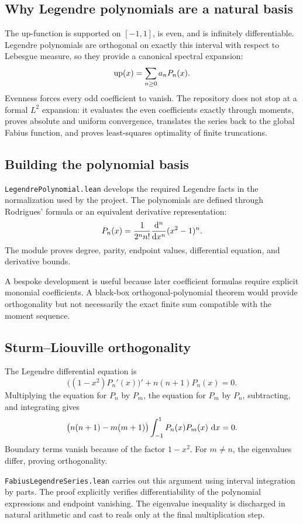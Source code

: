 \documentclass[11pt,oneside]{article}
\theoremstyle{definition}
\theoremstyle{remark}
\begin{document}
\subsection{Why Legendre polynomials are a natural basis}
The up-function is supported on \([-1,1]\), is even, and is infinitely differentiable.  Legendre polynomials are orthogonal on exactly this interval with respect to Lebesgue measure, so they provide a canonical spectral expansion:
\[
  \operatorname{up}(x)=\sum_{n\geq0}a_nP_n(x).
\]
Evenness forces every odd coefficient to vanish.  The repository does not stop at a formal \(L^2\) expansion: it evaluates the even coefficients exactly through moments, proves absolute and uniform convergence, translates the series back to the global Fabius function, and proves least-squares optimality of finite truncations.

\subsection{Building the polynomial basis}
\nolinkurl{LegendrePolynomial.lean} develops the required Legendre facts in the normalization used by the project.  The polynomials are defined through Rodrigues' formula or an equivalent derivative representation:
\[
  P_n(x)=\frac{1}{2^n n!}
          \frac{\mathop{}\!\mathrm{d}^n}{\mathop{}\!\mathrm{d} x^n}(x^2-1)^n.
\]
The module proves degree, parity, endpoint values, differential equation, and derivative bounds.

A bespoke development is useful because later coefficient formulas require explicit monomial coefficients.  A black-box orthogonal-polynomial theorem would provide orthogonality but not necessarily the exact finite sum compatible with the moment sequence.

\subsection{Sturm--Liouville orthogonality}
The Legendre differential equation is
\[
  \bigl((1-x^2)P_n'(x)\bigr)'+n(n+1)P_n(x)=0.
\]
Multiplying the equation for \(P_n\) by \(P_m\), the equation for \(P_m\) by \(P_n\), subtracting, and integrating gives
\[
  \bigl(n(n+1)-m(m+1)\bigr)
  \int_{-1}^{1}P_n(x)P_m(x)\,\mathop{}\!\mathrm{d} x=0.
\]
Boundary terms vanish because of the factor \(1-x^2\).  For \(m\ne n\), the eigenvalues differ, proving orthogonality.

\nolinkurl{FabiusLegendreSeries.lean} carries out this argument using interval integration by parts.  The proof explicitly verifies differentiability of the polynomial expressions and endpoint vanishing.  The eigenvalue inequality is discharged in natural arithmetic and cast to reals only at the final multiplication step.
\end{document}
